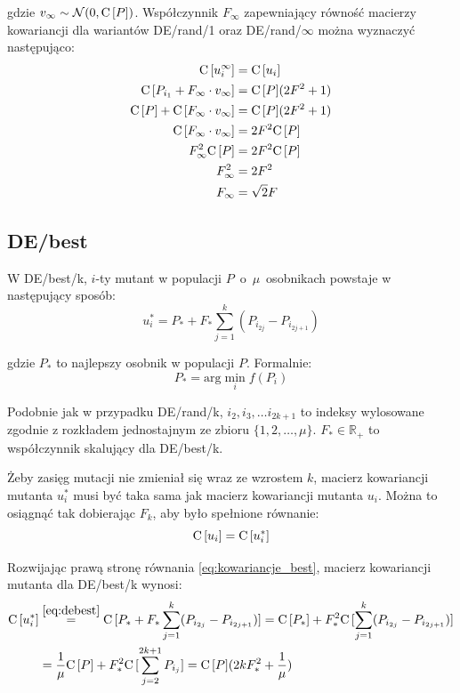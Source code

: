 \documentclass[a4paper,onecolumn,oneside,12pt,wide,floatssmall]{mwrep}
\def\C{{\rm C}\,}
\theoremstyle{definition}
\theoremstyle{plain}%
\theoremstyle{remark}
\begin{document}
gdzie $v_\infty \sim \mathcal{N}(0, \C[P])$. Współczynnik $F_\infty$ zapewniający
równość macierzy kowariancji dla wariantów DE/rand/1 oraz DE/rand/$\infty$
można wyznaczyć następująco:
\begin{align*}
\C[u_i^\infty] &= \C[u_i] \\
\C[P_{i_1} + F_\infty \cdot v_\infty] &= \C[P](2F^2 + 1) \\
\C[P] + \C[F_\infty \cdot v_\infty] &= \C[P](2F^2 + 1) \\
\C[F_\infty \cdot v_\infty] &= 2F^2\C[P] \\
F_\infty^2 \C[P] &= 2F^2\C[P] \\
F_\infty^2 &= 2F^2 \\
F_\infty &= \sqrt{2}F
\end{align*}

\subsection{DE/best}

W DE/best/k, $i$-ty mutant w populacji $P$~o~$\mu$~osobnikach powstaje w następujący sposób:
\begin{equation} \label{eq:debest}
u_i^* = P_* + F_*\sum\limits_{j=1}^k (P_{i_{2j}} - P_{i_{2j+1}})
\end{equation}

gdzie $P_*$ to najlepszy osobnik w populacji $P$. Formalnie:
\begin{equation} \label{eq:best_point}
P_* = \text{arg} \min_i f(P_i)
\end{equation}

Podobnie jak w przypadku DE/rand/k, $i_2, i_3, \dots i_{2k+1}$ to indeksy wylosowane zgodnie z rozkładem jednostajnym ze zbioru 
$\{1, 2, \dots, \mu\}$. $F_*\in\mathbb{R_+}$ to współczynnik skalujący dla DE/best/k. 

Żeby zasięg mutacji nie zmieniał się wraz ze wzrostem $k$, 
macierz kowariancji mutanta $u_i^*$ musi być taka sama jak macierz kowariancji mutanta $u_i$.
Można to osiągnąć tak dobierając $F_k$, aby było spełnione równanie:
\begin{equation} \label{eq:kowariancje_best}
\C[u_i] = \C[u_i^*]
\end{equation}

Rozwijając prawą stronę równania \eqref{eq:kowariancje_best},  macierz kowariancji mutanta dla DE/best/k wynosi:
\begin{equation}
\begin{align}
 \label{eq:macierz_kow_mutanta_star}
\C[u_i^*] &\overset{\eqref{eq:debest}}{=} \C[P_* + F_*\sum\limits_{j=1}^k (P_{i_{2j}} - P_{i_{2j+1}})] 
= \C[P_*] + F_*^2\C[\sum\limits_{j=1}^k (P_{i_{2j}} - P_{i_{2j+1}})] \\
&= \frac{1}{\mu}\C[P] + F_*^2\C[\sum\limits_{j=2}^{2k+1} P_{i_{j}}] = \C[P](2kF_*^2 + \frac{1}{\mu})
\end{align}
\end{equation}
\end{document}
